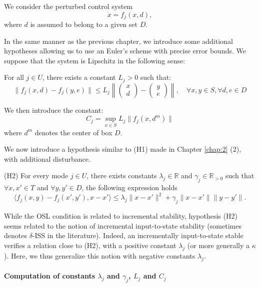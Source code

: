 We consider the perturbed control system
\begin{equation}
  \dot x = f_j(x,d),
\end{equation}
where $d$ is assumed to belong to a given set $D$. 


In the same manner as the previous chapter, we introduce some additional
hypotheses allowing us to use an Euler's scheme with precise error bounds.
We suppose that the system is Lipschitz in the following sense:

For all $j \in U$, there exists a constant $L_j >0$ such that:
$$ \| f_{j} (x,d) - f_{j} (y,e) \| \leq L_j \left\| \begin{pmatrix} x \\ d \end{pmatrix} - \begin{pmatrix} y \\ e \end{pmatrix} \right\|, \quad \forall x,y \in S, \forall d,e \in D$$

We then introduce the constant:
$$ C_j = \sup_{x \in S} L_j \| f_j(x,d^m) \|$$
where $d^m$ denotes the center of box $D$. 

We now introduce a hypothesis similar to (H1) made in Chapter \ref{chap:2} (2), with additional
disturbance.

(H2) For every mode $j \in U$, there exists constants
$\lambda_j \in \mathbb{R}$ and $\gamma_j \in
\mathbb{R}_{>0}$ such that $\forall x,x' \in T$ and $\forall y,y'
\in D $, the following expression holds
$$ \langle f_j (x,y) - f_j (x',y'), x - x' \rangle \leq \lambda_j \| x - x' \|^2 + \gamma_j \| x - x' \| \| y - y' \|. $$

While the OSL condition is related to incremental stability, hypothesis (H2)
seems related to the notion of incremental input-to-state stability
(sometimes denotes $\delta$-ISS in the literature). Indeed, 
an incrementally input-to-state stable verifies a relation close to (H2), with 
a positive constant $\lambda_j$ (or more generally a $\kappa$). 
Here, we thus generalize this notion with negative constants $\lambda_j$.

\paragraph{Computation of constants $\lambda_j$ and $\gamma_j$, $L_j$ and $C_j$}

